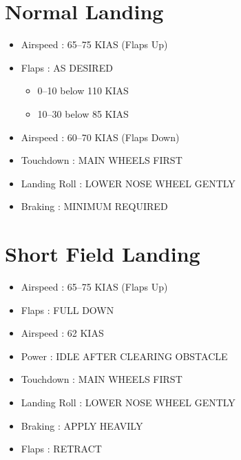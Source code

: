 \chapter{Normal Landing}
\label{normallanding}

\begin{itemize}
\item{} Airspeed : 65--75 KIAS (Flaps Up)

\item{} Flaps : AS DESIRED

\begin{itemize}
\item{} 0--10 below 110 KIAS

\item{} 10--30 below 85 KIAS

\end{itemize}

\item{} Airspeed : 60--70 KIAS (Flaps Down)

\item{} Touchdown : MAIN WHEELS FIRST

\item{} Landing Roll : LOWER NOSE WHEEL GENTLY

\item{} Braking : MINIMUM REQUIRED

\end{itemize}

\chapter{Short Field Landing}
\label{shortfieldlanding}

\begin{itemize}
\item{} Airspeed : 65--75 KIAS (Flaps Up)

\item{} Flaps : FULL DOWN

\item{} Airspeed : 62 KIAS

\item{} Power : IDLE AFTER CLEARING OBSTACLE

\item{} Touchdown : MAIN WHEELS FIRST

\item{} Landing Roll : LOWER NOSE WHEEL GENTLY

\item{} Braking : APPLY HEAVILY

\item{} Flaps : RETRACT

\end{itemize}

